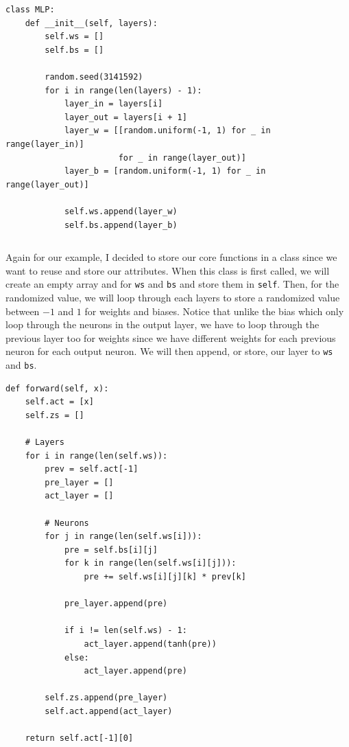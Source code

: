 \documentclass[../../../main.tex]{subfiles}
\begin{document}
\begin{jupyter}
\begin{lstlisting}[style=jin]
class MLP:
    def __init__(self, layers):
        self.ws = []
        self.bs = []

        random.seed(3141592)
        for i in range(len(layers) - 1):
            layer_in = layers[i]
            layer_out = layers[i + 1]
            layer_w = [[random.uniform(-1, 1) for _ in range(layer_in)]
                       for _ in range(layer_out)]
            layer_b = [random.uniform(-1, 1) for _ in range(layer_out)]

            self.ws.append(layer_w)
            self.bs.append(layer_b)
\end{lstlisting}
\begin{lstlisting}[style=jout]
\end{lstlisting}
\end{jupyter}

Again for our example, I decided to store our core functions in
a class since we want to reuse and store our attributes.
When this class is first called, we will create an empty array
and for \verb|ws| and \verb|bs| and store them in \verb|self|. Then,
for the randomized value, we will loop through each layers to store
a randomized value between $-1$ and $1$ for weights and biases.
Notice that unlike the bias which only loop through the neurons
in the output layer, we have to loop through the previous layer
too for weights since we have different weights for each previous
neuron for each output neuron. We will then append, or store, our
layer to \verb|ws| and \verb|bs|.

\begin{jupyter}
\begin{lstlisting}[style=jin]
def forward(self, x):
    self.act = [x]
    self.zs = []
    
    # Layers
    for i in range(len(self.ws)):
        prev = self.act[-1]
        pre_layer = []
        act_layer = []

        # Neurons
        for j in range(len(self.ws[i])):
            pre = self.bs[i][j]
            for k in range(len(self.ws[i][j])):
                pre += self.ws[i][j][k] * prev[k]
            
            pre_layer.append(pre)

            if i != len(self.ws) - 1:
                act_layer.append(tanh(pre))
            else:
                act_layer.append(pre)
                
        self.zs.append(pre_layer)
        self.act.append(act_layer)
        
    return self.act[-1][0]
\end{lstlisting}
\begin{lstlisting}[style=jout]
\end{lstlisting}
\end{jupyter}
\end{document}
